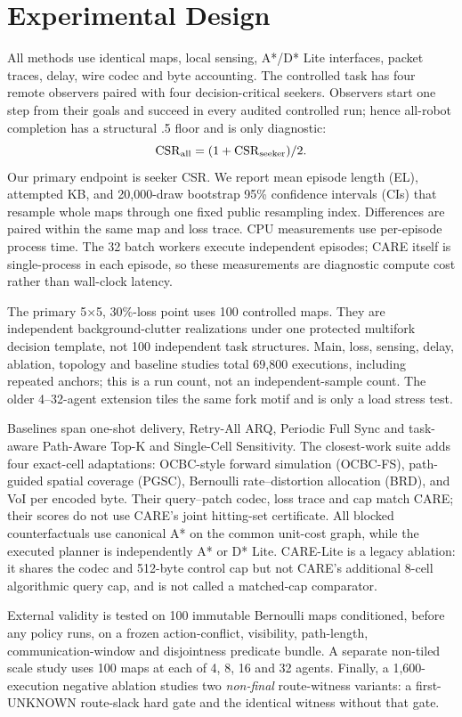 \documentclass[conference]{IEEEtran}
\begin{document}
\section{Experimental Design}
All methods use identical maps, local sensing, A*/D* Lite interfaces, packet
traces, delay, wire codec and byte accounting. The controlled task has four
remote observers paired with four decision-critical seekers. Observers start
one step from their goals and succeed in every audited controlled run; hence
all-robot completion has a structural .5 floor and is only diagnostic:
\begin{equation}
 \mathrm{CSR}_{\rm all}=(1+\mathrm{CSR}_{\rm seeker})/2.
\end{equation}
Our primary endpoint is seeker CSR. We report mean episode length (EL),
attempted KB, and 20,000-draw bootstrap 95\% confidence intervals (CIs) that
resample whole maps through one fixed public resampling index. Differences are
paired within the same map and loss trace. CPU measurements use per-episode
process time. The 32 batch workers execute independent episodes; CARE itself
is single-process in each episode, so these measurements are diagnostic
compute cost rather than wall-clock latency.

The primary 5$\times$5, 30\%-loss point uses 100 controlled maps. They are
independent background-clutter realizations under one protected multifork
decision template, not 100 independent task structures. Main, loss, sensing,
delay, ablation, topology and baseline studies total 69,800 executions,
including repeated anchors; this is a run count, not an independent-sample
count. The older 4--32-agent extension tiles the same fork motif and is only a
load stress test.

Baselines span one-shot delivery, Retry-All ARQ, Periodic Full Sync and
task-aware Path-Aware Top-K and Single-Cell Sensitivity. The closest-work suite
adds four exact-cell adaptations: OCBC-style forward simulation (OCBC-FS),
path-guided spatial coverage (PGSC), Bernoulli rate--distortion allocation
(BRD), and VoI per encoded byte. Their query--patch codec, loss trace and cap
match CARE; their scores do not use CARE's joint hitting-set certificate.
All blocked counterfactuals use canonical A* on the common unit-cost graph,
while the executed planner is independently A* or D* Lite.
CARE-Lite is a legacy ablation: it shares the codec and 512-byte control cap
but not CARE's additional 8-cell algorithmic query cap, and is not called a
matched-cap comparator.

External validity is tested on 100 immutable Bernoulli maps conditioned, before
any policy runs, on a frozen action-conflict, visibility, path-length,
communication-window and disjointness predicate bundle. A
separate non-tiled scale study uses 100 maps at each of 4, 8, 16 and 32 agents.
Finally, a 1,600-execution negative ablation studies two \emph{non-final}
route-witness variants: a first-UNKNOWN route-slack hard gate and the identical
witness without that gate.
\end{document}
